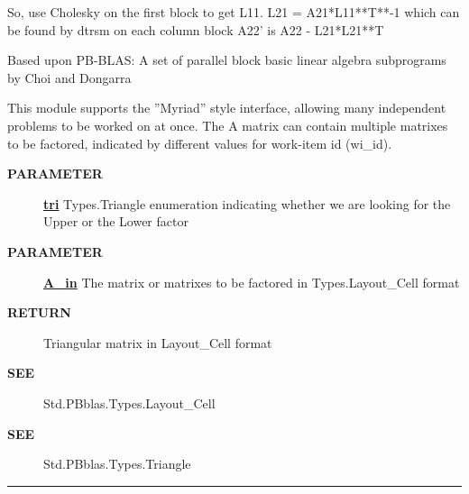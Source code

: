  So, use Cholesky on the first block to get L11. L21 = A21*L11**T**-1 which can be found by dtrsm on each column block A22' is A22 - L21*L21**T 
\par
 Based upon PB-BLAS: A set of parallel block basic linear algebra subprograms by Choi and Dongarra 


\par
 This module supports the ''Myriad'' style interface, allowing many independent problems to be worked on at once. The A matrix can contain multiple matrixes to be factored, indicated by different values for work-item id (wi\_id).



\par
\begin{description}
\item [\colorbox{tagtype}{\color{white} \textbf{\textsf{PARAMETER}}}] \textbf{\underline{tri}} Types.Triangle enumeration indicating whether we are looking for the Upper or the Lower factor
\item [\colorbox{tagtype}{\color{white} \textbf{\textsf{PARAMETER}}}] \textbf{\underline{A\_in}} The matrix or matrixes to be factored in Types.Layout\_Cell format
\item [\colorbox{tagtype}{\color{white} \textbf{\textsf{RETURN}}}] \textbf{\underline{}} Triangular matrix in Layout\_Cell format
\item [\colorbox{tagtype}{\color{white} \textbf{\textsf{SEE}}}] \textbf{\underline{}} Std.PBblas.Types.Layout\_Cell
\item [\colorbox{tagtype}{\color{white} \textbf{\textsf{SEE}}}] \textbf{\underline{}} Std.PBblas.Types.Triangle
\end{description}

\rule{\linewidth}{0.5pt}
